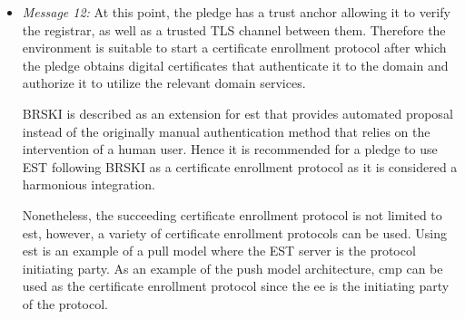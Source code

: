 \begin{itemize}
	\item \textit{Message 12:} 
	At this point, the pledge has a trust anchor allowing it to verify the registrar, as well as a trusted TLS channel between them. Therefore the environment is suitable to start a certificate enrollment protocol after which the pledge obtains digital certificates that authenticate it to the domain and authorize it to utilize the relevant domain services.
	\par
	BRSKI is described as an extension for \gls{est} that provides automated proposal instead of the originally manual authentication method that relies on the intervention of a human user. Hence it is recommended for a pledge to use EST following BRSKI as a certificate enrollment protocol as it is considered a harmonious integration.
	\par 
	Nonetheless, the succeeding certificate enrollment protocol is not limited to \gls{est}, however, a variety of certificate enrollment protocols can be used. Using \gls{est} is an example of a pull model where the EST server is the protocol initiating party. As an example of the push model architecture, \gls{cmp} can be used as the certificate enrollment protocol since the \gls{ee} is the initiating party of the protocol. 
	

\end{itemize}









